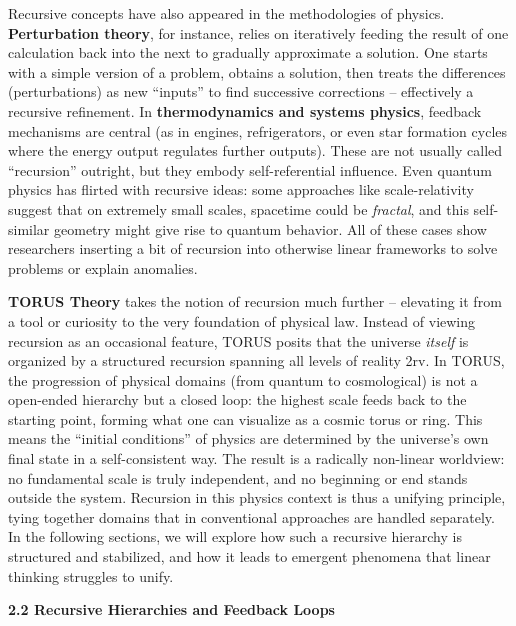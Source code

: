 \documentclass[]{article}
\begin{document}
{Recursive concepts have also appeared in the methodologies of physics.
\textbf{Perturbation theory}, for instance, relies on iteratively
feeding the result of one calculation back into the next to gradually
approximate a solution. One starts with a simple version of a problem,
obtains a solution, then treats the differences (perturbations) as new
``inputs'' to find successive corrections -- effectively a recursive
refinement. In \textbf{thermodynamics and systems physics}, feedback
mechanisms are central (as in engines, refrigerators, or even star
formation cycles where the energy output regulates further outputs).
These are not usually called ``recursion'' outright, but they embody
self-referential influence. Even quantum physics has flirted with
recursive ideas: some approaches like scale-relativity suggest that on
extremely small scales, spacetime could be \emph{fractal}, and this
self-similar geometry might give rise to quantum behavior​. All of these
cases show researchers inserting a bit of recursion into otherwise
linear frameworks to solve problems or explain anomalies.

\textbf{TORUS Theory} takes the notion of recursion much further --
elevating it from a tool or curiosity to the very foundation of physical
law. Instead of viewing recursion as an occasional feature, TORUS posits
that the universe \emph{itself} is organized by a structured recursion
spanning all levels of reality​ 2rv. In TORUS, the progression of
physical domains (from quantum to cosmological) is not a open-ended
hierarchy but a closed loop: the highest scale feeds back to the
starting point, forming what one can visualize as a cosmic torus or
ring. This means the ``initial conditions'' of physics are determined by
the universe's own final state in a self-consistent way. The result is a
radically non-linear worldview: no fundamental scale is truly
independent, and no beginning or end stands outside the system.
Recursion in this physics context is thus a unifying principle, tying
together domains that in conventional approaches are handled separately.
In the following sections, we will explore how such a recursive
hierarchy is structured and stabilized, and how it leads to emergent
phenomena that linear thinking struggles to unify.

\textbf{2.2 Recursive Hierarchies and Feedback Loops}

}
\end{document}
